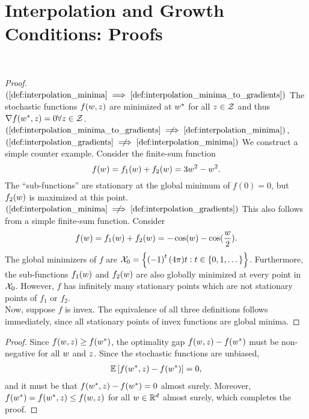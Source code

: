 
\section{Interpolation and Growth Conditions: Proofs}~\label{app:interpolation_gc}


\interpRelationships*
\begin{proof}
    \( (\autoref{def:interpolation_minima} \implies \autoref{def:interpolation_minima_to_gradients}) \)
    The stochastic functions \( f(w,z) \) are minimized at \( w^* \) for all \( z \in \mathcal{Z} \) and thus \( \nabla f(w^*, z) = 0 \forall z \in \mathcal{Z} \).\\

    \( (\autoref{def:interpolation_minima_to_gradients} \centernot \implies \autoref{def:interpolation_minima}) \), \(
    (\autoref{def:interpolation_gradients} \centernot \implies \autoref{def:interpolation_minima}) \)
    We construct a simple counter example.
    Consider the finite-sum function
    \[ f(w) = f_1(w) + f_2(w) = 3w^2 - w^2. \]
    The ``sub-functions'' are stationary at the global minimum of \( f(0) = 0 \), but \( f_2(w) \) is maximized at this point.\\

    \( (\autoref{def:interpolation_minima} \centernot \implies \autoref{def:interpolation_gradients}) \) This also follows from a simple finite-sum function.
    Consider
    \[ f(w) = f_1(w) + f_2(w) = - \cos(w) - \cos(\frac{w}{2}). \]
    The global minimizers of \( f \) are \(\mathcal{X}_0 = \left\{\left(-1\right)^{t} (4\pi) t : t \in \left\{0,1, \dots \right\}\right\} \).
    Furthermore, the sub-functions \( f_1(w) \) and \( f_2(w) \) are also globally minimized at every point in \( \mathcal{X}_0 \).
    However, \( f \) has infinitely many stationary points which are not stationary points of \( f_1 \) or \( f_2 \).\\

    Now, suppose \( f \) is invex. The equivalence of all three definitions follows immediately, since all stationary points of invex functions are global minima.
\end{proof}

\boundedBelow*
\begin{proof}
    Since \( f(w, z ) \geq f(w^*) \), the optimality gap \( f(w,z) - f(w^*) \) must be non-negative for all \( w \) and \( z \).
    Since the stochastic functions are unbiased,
    \begin{align*}
        \mathbb{E} \left[f(w^*,z) - f(w^*)\right] = 0,
    \end{align*}
    and it must be that \( f(w^*,z) - f(w^*) = 0 \) almost surely.
    Moreover, \( f(w^*) = f(w^*,z) \leq f(w, z) \) for all \( w \in \mathbb{R}^d \) almost surely, which completes the proof.
\end{proof}


